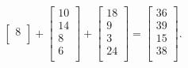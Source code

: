 \begin{eks}
\begin{center}
$$\begin{bmatrix}
8\\
\end{bmatrix}
+
\begin{bmatrix}
10\\
14\\
8\\
6\\
\end{bmatrix}
+
\begin{bmatrix}
18\\
9\\
3\\
24\\
\end{bmatrix}
=
\begin{bmatrix}
36\\
39\\
15\\
38\\
\end{bmatrix}.
$$
\end{center}
\end{eks}
 
